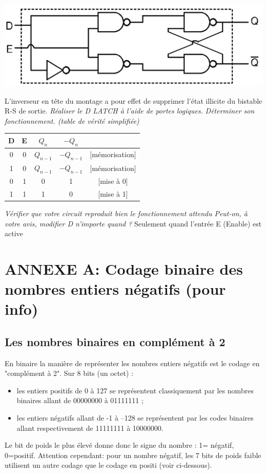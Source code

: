 \begin{center}
\includegraphics[scale=0.2]{Labo3_DLatch.png}
\end{center}

L'inverseur en tête du montage a pour effet de supprimer l'état illicite du bistable R-S de sortie.
{
\textit{Réaliser le D LATCH à l'aide de portes logiques.}
}
{%
}
{
\textit{Déterminer son fonctionnement. (table de vérité simplifiée)}
}
{%
	\begin{center}
		\begin{tabular}{|c|c|c|c|c|}
			\hline
            D&E&$Q_{n}$&$-Q_{n}$&\\
            \hline
            \hline
			0&0&$Q_{n-1}$&$-Q_{n-1}$&[mémorisation]\\
			1&0&$Q_{n-1}$&$-Q_{n-1}$&[mémorisation]\\
			0&1&0&1&[mise à 0]\\
			1&1&1&0&[mise à 1]\\
			\hline
		\end{tabular}
	\end{center}
}
{
\textit{Vérifier que votre circuit reproduit bien le fonctionnement attendu}
}
{%
}
{
\textit{Peut-on, à votre avis, modifier D n'importe quand ?}
}
{%
Seulement quand l’entrée E (Enable) est active
}


\newpage
\section*{ANNEXE A: Codage binaire des nombres entiers négatifs (pour info)}
\label{ANNEXE A}
\subsection*{Les nombres binaires en complément à 2}
En binaire la manière de représenter les nombres entiers négatifs est le codage en "complément à 2". Sur 8 bits (un octet) :
\begin{itemize}
\item les entiers positifs de 0 à 127 se représentent classiquement par les nombres binaires allant de 00000000 à 01111111 ;
\item les entiers négatifs allant de -1 à –128 se représentent par les codes binaires allant respectivement de 11111111 à 10000000.
\end{itemize}
Le bit de poids le plus élevé donne donc le signe du nombre : 1= négatif, 0=positif.
Attention cependant: pour un nombre négatif, les 7 bits de poids faible utilisent un autre codage que le codage en positi (voir ci-dessous).


